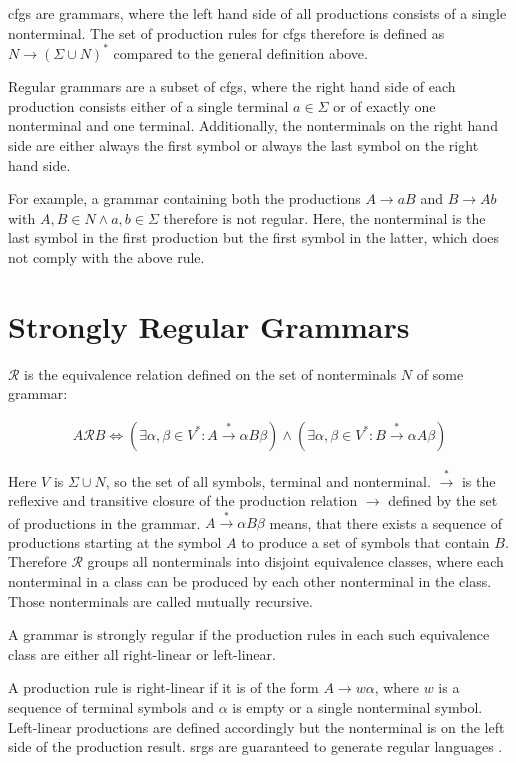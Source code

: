 \Acfp{cfg} are grammars, where the left hand side of all productions consists of a single nonterminal. The set of production rules for \acp{cfg} therefore is defined as $N \rightarrow (\Sigma \cup N)^*$ compared to the general definition above.

Regular grammars are a subset of \acp{cfg}, where the right hand side of each production consists either of a single terminal $a \in \Sigma$ or of exactly one nonterminal and one terminal. Additionally, the nonterminals on the right hand side are either always the first symbol or always the last symbol on the right hand side. 

For example, a grammar containing both the productions $A \rightarrow aB$ and $B \rightarrow Ab$ with $A, B \in N \land a, b \in \Sigma$ therefore is not regular. Here, the nonterminal is the last symbol in the first production but the first symbol in the latter, which does not comply with the above rule.

\section{Strongly Regular Grammars}\label{sec:background:srg}

$\mathcal{R}$ is the equivalence relation defined on the set of nonterminals $N$ of some grammar:

\begin{align}
	A \mathcal{R} B \Leftrightarrow (\exists \alpha, \beta \in V^* : A \xrightarrow{*} \alpha B \beta) \land (\exists \alpha, \beta \in V^* : B \xrightarrow{*} \alpha A \beta) 
\end{align}

Here $V$ is $\Sigma \cup N$, so the set of all symbols, terminal and nonterminal. $\xrightarrow{*}$ is the reflexive and transitive closure of the production relation $\rightarrow$ defined by the set of productions in the grammar. $A \xrightarrow{*} \alpha B \beta$ means, that there exists a sequence of productions starting at the symbol $A$ to produce a set of symbols that contain $B$. Therefore $\mathcal{R}$ groups all nonterminals into disjoint equivalence classes, where each nonterminal in a class can be produced by each other nonterminal in the class. Those nonterminals are called mutually recursive.

A grammar is strongly regular if the production rules in each such equivalence class are either all right-linear or left-linear.

A production rule is right-linear if it is of the form $A \rightarrow w \alpha$, where $w$ is a sequence of terminal symbols and $\alpha$ is empty or a single nonterminal symbol. Left-linear productions are defined accordingly but the nonterminal is on the left side of the production result.
\Aclp{srg} are guaranteed to generate regular languages \cite{mohri_nederhof}.

